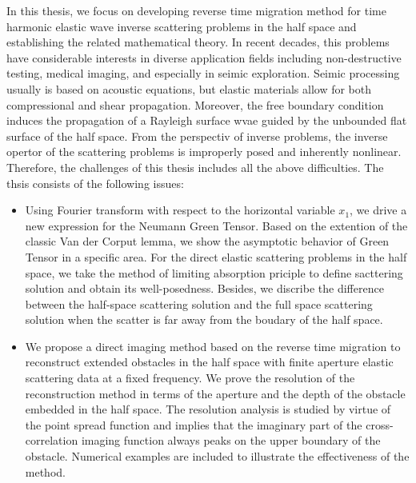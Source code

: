 In this thesis, we focus on developing reverse time migration method for time harmonic elastic wave inverse scattering problems in the half space and establishing the related mathematical theory. In recent decades, this problems have considerable interests in diverse application fields including non-destructive testing, medical imaging, and especially in seimic exploration.
Seimic processing
 usually is based on acoustic equations, but elastic materials allow for both compressional and shear propagation. Moreover, the free boundary condition induces the propagation of a Rayleigh surface wvae guided by the unbounded flat surface of the half space. From the perspectiv of inverse problems, the inverse opertor of the scattering problems is improperly posed and inherently nonlinear. Therefore, the challenges of this thesis includes all the above difficulties. The thsis consists of the following issues:
\begin{itemize}
	\item Using Fourier transform with respect to the horizontal variable $x_1$, we drive a new expression for the Neumann Green Tensor. Based on the extention of the classic Van der Corput lemma, we show the asymptotic behavior of Green Tensor in a specific area. For the direct elastic scattering problems in the half space, we take the method of limiting absorption priciple to define  sacttering solution and obtain its well-posedness. Besides, we discribe the difference between the half-space scattering solution and the full space scattering solution  when the scatter is far away from the boudary of the half space.
	
	
	\item We propose a direct imaging method based on the reverse time migration to reconstruct extended
	obstacles in the half space with finite aperture elastic scattering data at a fixed
	frequency. We prove the resolution of the reconstruction method in terms of the
	aperture and the depth of the obstacle embedded in the half space. The resolution
	analysis is studied by virtue of the point spread function and implies that the imaginary 
	part of the cross-correlation imaging function
	always peaks on the upper boundary of the obstacle. Numerical examples
	are included to illustrate the effectiveness of the method. 
\end{itemize}
	


